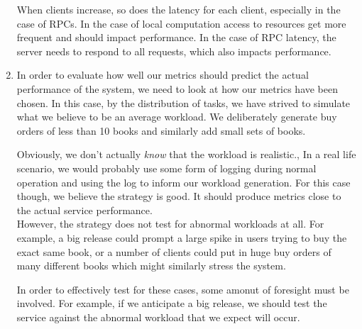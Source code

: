 \documentclass[11pt]{article}
\begin{document}
\begin{enumerate}
      When clients increase, so does the latency for each client, especially in
      the case of RPCs. In the case of local computation access to resources get
      more frequent and should impact performance. In the case of RPC latency,
      the server needs to respond to all requests, which also impacts
      performance.

    \item
      In order to evaluate how well our metrics should predict the actual performance
      of the system, we need to look at how our metrics have been chosen. In this
      case, by the distribution of tasks, we have strived to simulate what we believe
      to be an average workload. We deliberately generate buy orders of less than 10
      books and similarly add small sets of books.

      Obviously, we don't actually \textit{know} that the workload is
      realistic., In a real life scenario, we would probably use some form of
      logging during normal operation and using the log to inform our workload
      generation. For this case though, we believe the strategy is good. It
      should produce metrics close to the actual service performance.\\

      However, the strategy does not test for abnormal workloads at all. For example,
      a big release could prompt a large spike in users trying to buy the exact same
      book, or a number of clients could put in huge buy orders of many different
      books which might similarly stress the system.

      In order to effectively test for these cases, some amonut of foresight must be
      involved. For example, if we anticipate a big release, we should test the
      service against the abnormal workload that we expect will occur.
  \end{enumerate}
\end{document}
